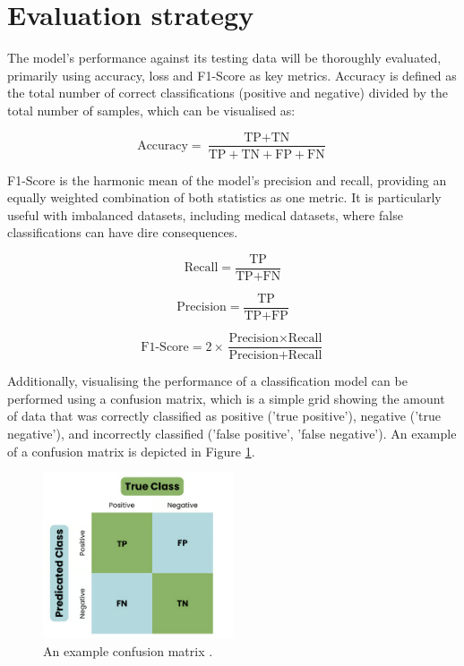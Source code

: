 \documentclass[12pt]{report}
\newcommand{\para}{\vspace{7pt}\noindent}
\begin{document}
\section{Evaluation strategy}
The model's performance against its testing data will be thoroughly evaluated, primarily using accuracy, loss and F1-Score as key metrics.
Accuracy is defined as the total number of correct classifications (positive and negative) divided by the total number of samples,
which can be visualised as:

\begin{equation}\label{eq:Accuracy}
    \text{Accuracy} = \frac{\text{TP} + \text{TN}}{\text{TP} + \text{TN} + \text{FP} + \text{FN}}
\end{equation}

\para F1-Score is the harmonic mean of the model's precision and recall, providing an equally weighted combination of both statistics as one 
metric. It is particularly useful with imbalanced datasets, including medical datasets, where false classifications can have dire consequences.

\begin{equation}\label{eq:Recall}
    \text{Recall} = \frac{\text{TP}}{\text{TP} + \text{FN}}
\end{equation}

\begin{equation}\label{eq:Precision}
    \text{Precision} = \frac{\text{TP}}{\text{TP} + \text{FP}}
\end{equation}

\begin{equation}\label{eq:F1Score}
    \text{F1-Score} = 2 \times \frac{\text{Precision} \times \text{Recall}}{\text{Precision} + \text{Recall}}
\end{equation}

\newpage 

\para Additionally, visualising the performance of a classification model can be performed using a confusion matrix, which is a simple grid 
showing the amount of data that was correctly classified as positive ('true positive'), negative ('true negative'), and incorrectly classified
('false positive', 'false negative'). An example of a confusion matrix is depicted in Figure \ref{fig:ConfusionMatrix}.

\begin{figure}[H]
    \centering
    \includegraphics[width=0.5\textwidth]{Proposal/ConfusionMatrix.png}
    \caption{An example confusion matrix \autocite{datacampWhatConfusionMatrix}. \label{fig:ConfusionMatrix}}
\end{figure}
\end{document}

